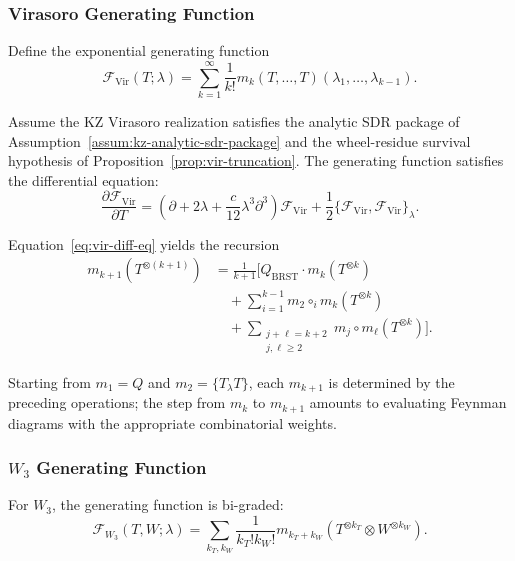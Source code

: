 \subsubsection{Virasoro Generating Function}

Define the exponential generating function
\begin{equation}
\mathcal{F}_{\text{Vir}}(T; \lambda) = \sum_{k=1}^\infty \frac{1}{k!} m_k(T, \ldots, T)(\lambda_1, \ldots, \lambda_{k-1}).
\end{equation}

\begin{theorem}
\label{thm:vir-gen-func-explicit}
Assume the KZ Virasoro realization satisfies the analytic SDR package
of Assumption~\ref{assum:kz-analytic-sdr-package} and the
wheel-residue survival hypothesis of
Proposition~\ref{prop:vir-truncation}.
The generating function satisfies the differential equation:
\begin{equation}
\label{eq:vir-diff-eq}
\frac{\partial \mathcal{F}_{\text{Vir}}}{\partial T} = \left( \partial + 2\lambda + \frac{c}{12}\lambda^3 \partial^3 \right) \mathcal{F}_{\text{Vir}} + \frac{1}{2} \{\mathcal{F}_{\text{Vir}}, \mathcal{F}_{\text{Vir}}\}_\lambda.
\end{equation}
\end{theorem}

\noindent Equation~\eqref{eq:vir-diff-eq} yields the recursion
\begin{align}
m_{k+1}(T^{\otimes (k+1)}) &= \frac{1}{k+1} \Bigg[ Q_{\text{BRST}} \cdot m_k(T^{\otimes k})\\
&\quad + \sum_{i=1}^{k-1} m_2 \circ_i m_k(T^{\otimes k})\\
&\quad + \sum_{\substack{j+\ell = k+2 \\ j,\ell \geq 2}} m_j \circ m_\ell(T^{\otimes k}) \Bigg].
\end{align}

Starting from $m_1 = Q$ and $m_2 = \{T_\lambda T\}$, each
$m_{k+1}$ is determined by the preceding operations;
the step from $m_k$ to $m_{k+1}$ amounts to evaluating
Feynman diagrams with the appropriate combinatorial weights.

\subsubsection{$W_3$ Generating Function}

For $W_3$, the generating function is bi-graded:
\begin{equation}
\mathcal{F}_{W_3}(T, W; \lambda) = \sum_{k_T, k_W} \frac{1}{k_T! k_W!} m_{k_T + k_W}(T^{\otimes k_T} \otimes W^{\otimes k_W}).
\end{equation}

